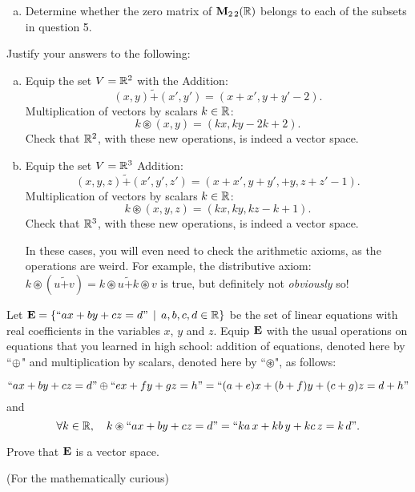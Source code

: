 \begin{prob}
\begin{enumerate}[a)]
\item  Determine whether the  zero matrix of $\mathbf{M}_{2 \,2}(\mathbb{R})$  belongs to each of the subsets in  question 5. \medskip 
%
 
\end{enumerate}


\end{prob} \begin{prob} \label{prob04.12} Justify your answers to the following:
\begin{enumerate}[a)]
\item Equip the set $V=\mathbb{R}^2$ with the  Addition: $$(x,y) \tilde+ (x',y')=(x+x', y+y'-2).$$ Multiplication of vectors  by  scalars $k\in \mathbb{R}$: $$k\circledast (x,y)=(kx, ky-2k+2).$$  Check that  $\mathbb{R}^2$, with these new operations, is indeed a vector space. \medskip
%
\item  Equip the set $V=\mathbb{R}^3$  Addition: $$(x,y,z) \tilde+ (x',y',z')=(x+x', y+y', +y,z+z'-1).$$ Multiplication of vectors  by  scalars $k\in \mathbb{R}$: $$k\circledast (x,y,z)=(kx, ky, kz-k+1).$$ Check that  $\mathbb{R}^3$, with these new operations, is indeed a vector space.

\medskip

In these cases, you will even need to check the arithmetic axioms, as the operations are weird. For example, the distributive axiom:  $k\circledast (u \tilde+ v)  = k\circledast u \tilde+ k\circledast v$ is true, but definitely not {\it obviously} so! 

 
\end{enumerate}
 
\end{prob} \begin{prob} \label{prob04.13}  Let $\mathbf{E}=\{``ax+by+ cz=d"\,\mid \, a,b,c, d\in\mathbb{R} \}$ be the set of linear equations with real coefficients in the variables $x$, $y$ and $z$. Equip $\mathbf{E}$ with the usual operations on equations that you learned in high school: addition of equations, denoted here by ``$\oplus$" and multiplication by scalars, denoted here by ``$\circledast$", as follows: 

$$``ax+by+ cz=d" \oplus ``ex+fy+gz=h" =``(a+e)x + (b+f)y + (c+g)z=d+h"$$and
$$ \forall   k\in \mathbb{R},\quad    k\circledast``ax+by+ cz=d" = `` ka\, x+ kb \,y+ kc \,z = k\,d".$$

Prove that $\mathbf{E}$ is a vector space.  \bigskip
 
\end{prob} \begin{prob} \label{prob04.14} (For the mathematically curious)
\label{exVS}
\begin{enumerate}[a)] 


\end{enumerate}
\end{prob}
